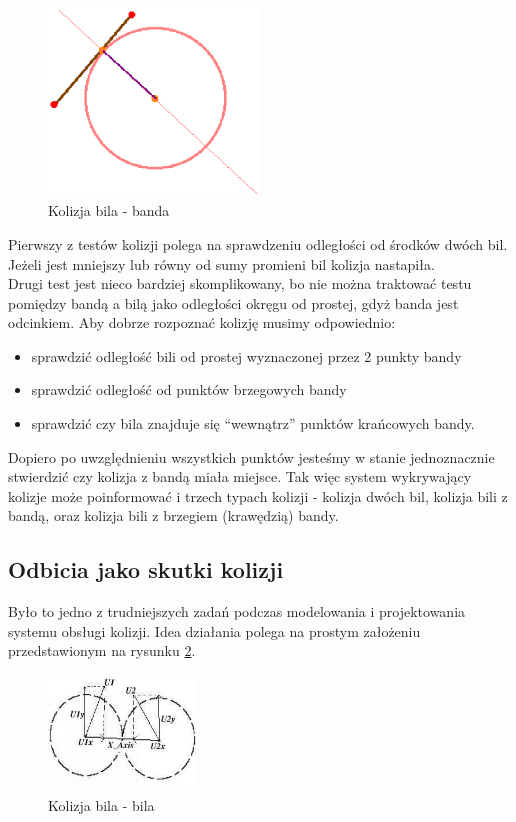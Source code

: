 \begin{figure}[h]
  \centering
  \includegraphics[width=0.5\textwidth]{./img/bbd_col.eps}
  \caption{Kolizja bila - banda}
  \label{fig:bbdcol}
\end{figure}

Pierwszy z testów kolizji polega na sprawdzeniu odległości od środków dwóch bil. Jeżeli jest mniejszy lub równy od sumy promieni bil kolizja nastapiła.\\
Drugi test jest nieco bardziej skomplikowany, bo nie można traktować testu pomiędzy bandą a bilą jako odległości okręgu od prostej, gdyż banda jest odcinkiem. Aby dobrze rozpoznać kolizję musimy odpowiednio:

\begin{itemize}
 \item sprawdzić odległość bili od prostej wyznaczonej przez 2 punkty bandy
 \item sprawdzić odległość od punktów brzegowych bandy
 \item sprawdzić czy bila znajduje się ``wewnątrz'' punktów krańcowych bandy.
\end{itemize}

Dopiero po uwzględnieniu wszystkich punktów jesteśmy w stanie jednoznacznie stwierdzić czy kolizja z bandą miała miejsce.
Tak więc system wykrywający kolizje może poinformować i trzech typach kolizji - kolizja dwóch bil, kolizja bili z bandą, 
oraz kolizja bili z brzegiem (krawędzią) bandy.


\subsection{Odbicia jako skutki kolizji}

Było to jedno z trudniejszych zadań podczas modelowania i projektowania systemu obsługi kolizji. Idea działania
polega na prostym założeniu przedstawionym na rysunku \ref{fig:col}.

\begin{figure}[h]
  \centering
  \includegraphics[width=0.35\textwidth]{./img/col.eps}
  \caption{Kolizja bila - bila}
  \label{fig:col}
\end{figure}

